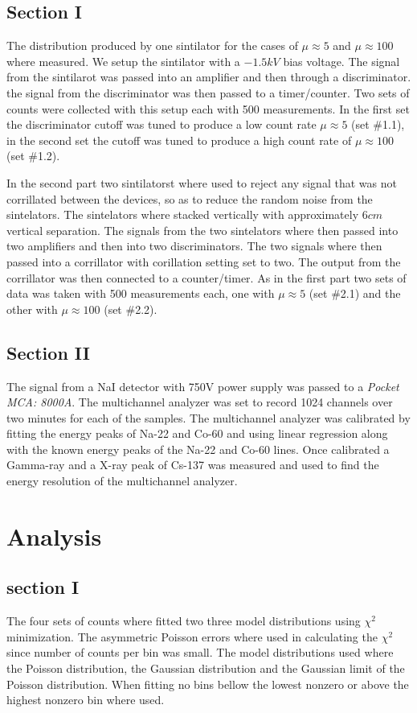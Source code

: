 \documentclass[%
 reprint,
 amsmath,amssymb,
 aps,
]{revtex4-1}
\begin{document}
\subsection{Section I}
The distribution produced by one sintilator for the cases of $\mu\approx5$ and $\mu\approx100$ where measured. We setup the sintilator with a $-1.5kV$ bias voltage. The signal from the sintilarot was passed into an amplifier and then through a discriminator. the signal from the discriminator was then passed to a timer/counter. Two sets of counts were collected with this setup each with 500 measurements. In the first set the discriminator cutoff was tuned to produce a low count rate $\mu\approx5$ (set \#1.1), in the second set the cutoff was tuned to produce a high count rate of $\mu\approx100$ (set \#1.2).

In the second part two sintilatorst where used to reject any signal that was not corrillated between the devices, so as to reduce the random noise from the sintelators. The sintelators where stacked vertically with approximately $6cm$ vertical separation. The signals from the two sintelators where then passed into two amplifiers and then into two discriminators. The two signals where then passed into a corrillator with corillation setting set to two. The output from the corrillator was then connected to a counter/timer. As in the first part two sets of data was taken with 500 measurements each, one with $\mu\approx5$ (set \#2.1) and the other with $\mu\approx100$ (set \#2.2).

\subsection{Section II}
The signal from a NaI detector with 750V power supply was passed to a \textit{Pocket MCA: 8000A}. The multichannel analyzer was set to record 1024 channels over two minutes for each of the samples. The multichannel analyzer was calibrated by fitting the energy peaks of Na-22 and Co-60 and using linear regression along with the known energy peaks of the Na-22 and Co-60 lines. Once calibrated a Gamma-ray and a X-ray peak of Cs-137 was measured and used to find the energy resolution of the multichannel analyzer.

\section{Analysis}
\subsection{section I}
The four sets of counts where fitted two three model distributions using $\chi^2$ minimization. The asymmetric Poisson errors where used in calculating the $\chi^2$ since number of counts per bin was small. The model distributions used where the Poisson distribution, the Gaussian distribution and the Gaussian limit of the Poisson distribution. When fitting no bins bellow the lowest nonzero or above the highest nonzero bin where used.
\end{document}
